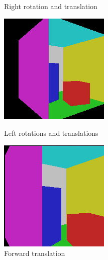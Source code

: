 \begin{figure}[H]
    \caption{Right rotation and translation}
\endminipage\hfill
{}
    \centering
    \includegraphics[width=\linewidth]{img/left.jpg}
    \caption{Left rotations and translations}
\endminipage\hfill
{}
    \centering
    \includegraphics[width=\linewidth]{img/forward.jpg}
    \caption{Forward translation}
\endminipage\hfill
\end{figure}

